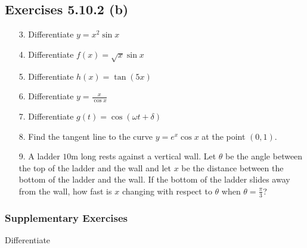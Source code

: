 \subsection{Exercises 5.10.2 (b)}
\begin{enumerate}
	\item [3.] Differentiate $y =x^{2} \sin  x$ 
	
	\item [4.] Differentiate $f (x) =\sqrt{x} \sin  x$ 
	
	\item [5.] Differentiate $h (x) =\tan  (5 x)$ 
	
	\item [6.] Differentiate $y =\frac{x}{\cos  x}$ 
	
	\item [7.] Differentiate $g (t) =\cos  (\omega  t +\delta )$ 
	
	\item [8.] Find the tangent line to the curve $y =e^{x} \cos  x$ at the point $(0 ,1)$. 
	
	\item [9.]
	A ladder $10 \mbox{m}$ long rests against a vertical wall. Let
	$\theta $ be the angle between the top of the ladder and the wall and let $x$ be the distance between the bottom of the ladder and the wall. If the bottom of
	the ladder slides away from the wall, how fast is $x$ changing with respect to $\theta $ when $\theta  =\frac{\pi }{3}$? \end{enumerate}


\subsubsection{Supplementary Exercises}
Differentiate 


